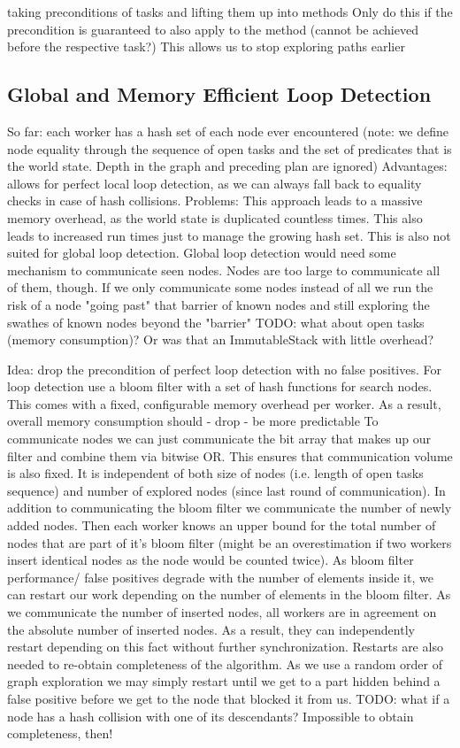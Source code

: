 \documentclass[12pt,a4paper,twoside]{scrartcl}
\numberwithin{equation}{section}
\begin{document}
taking preconditions of tasks and lifting them up into methods
Only do this if the precondition is guaranteed to also apply to the method (cannot be achieved before the respective task?)
This allows us to stop exploring paths earlier

\subsection{Global and Memory Efficient Loop Detection}
So far: each worker has a hash set of each node ever encountered (note: we define node equality through the sequence of open tasks and the set of predicates that is the world state. Depth in the graph and preceding plan are ignored)
Advantages: allows for perfect local loop detection, as we can always fall back to equality checks in case of hash collisions.
Problems: This approach leads to a massive memory overhead, as the world state is duplicated countless times. This also leads to increased run times just to manage the growing hash set.
This is also not suited for global loop detection. Global loop detection would need some mechanism to communicate seen nodes. Nodes are too large to communicate all of them, though. If we only communicate some nodes instead of all we run the risk of a node "going past" that barrier of known nodes and still exploring the swathes of known nodes beyond the "barrier"
TODO: what about open tasks (memory consumption)? Or was that an ImmutableStack with little overhead?

Idea: drop the precondition of perfect loop detection with no false positives.
For loop detection use a bloom filter with a set of hash functions for search nodes.
This comes with a fixed, configurable memory overhead per worker. As a result, overall memory consumption should
- drop
- be more predictable
To communicate nodes we can just communicate the bit array that makes up our filter and combine them via bitwise OR. This ensures that communication volume is also fixed. It is independent of both size of nodes (i.e. length of open tasks sequence) and number of explored nodes (since last round of communication).
In addition to communicating the bloom filter we communicate the number of newly added nodes. Then each worker knows an upper bound for the total number of nodes that are part of it's bloom filter (might be an overestimation if two workers insert identical nodes as the node would be counted twice). As bloom filter performance/ false positives degrade with the number of elements inside it, we can restart our work depending on the number of elements in the bloom filter.
As we communicate the number of inserted nodes, all workers are in agreement on the absolute number of inserted nodes. As a result, they can independently restart depending on this fact without further synchronization.
Restarts are also needed to re-obtain completeness of the algorithm. As we use a random order of graph exploration we may simply restart until we get to a part hidden behind a false positive before we get to the node that blocked it from us.
TODO: what if a node has a hash collision with one of its descendants? Impossible to obtain completeness, then!
\end{document}
